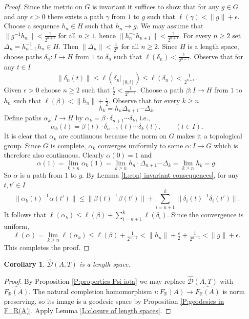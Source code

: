 \documentclass[12pt]{amsart}
\newtheorem{cor}[prop]{Corollary}
\theoremstyle{definition}
\def\RR{\ensuremath{\mathbb{R}}}
\def\Free{F}
\def\D{\mathcal{D}}
\def\tD{\hat{\D}}
\begin{document}
\begin{proof}
Since the metric on $G$ is invariant it suffices to show that for any $g \in G$ and any $\epsilon >0$ there exists a path $\gamma$ from $1$ to $g$ such that $\ell(\gamma)<\|g\|+\epsilon$.
Choose a sequence $h_n \in H$ such that $h_n \to g$.
We may assume that $\|g^{-1}h_n\|<\tfrac{1}{2^{n+2}}$ for all $n \geq 1$, hence $\|h_n^{-1}h_{n+1}\|<\tfrac{1}{2^{n+1}}$.
For every $n \geq 2$ set $\Delta_n=h_{n-1}^{-1} h_n \in H$.
Then $\| \Delta_n\| < \tfrac{1}{2^n}$ for all $n \geq 2$.
Since $H$ is a length space, choose paths $\delta_n \colon I \to H$ from $1$ to $\delta_n$ such that $\ell(\delta_n)<\tfrac{1}{2^{n-1}}$.
Observe that for any $t \in I$
\[
\|\delta_n(t)\| \leq \ell(\delta_n|_{[0,t]}) \leq \ell(\delta_n)<\tfrac{1}{2^{n-1}}.
\]
Given $\epsilon>0$ choose $n \geq 2$ such that $\tfrac{\epsilon}{2} < \tfrac{1}{2^{n-2}}$.
Choose a path $\beta \colon I \to H$ from $1$ to $h_n$ such that $\ell(\beta)<\|h_n\|+\tfrac{\epsilon}{2}$.
Observe that for every $k \geq n$
\[
h_k = h_n \Delta_{n+1} \cdots \Delta_k.
\]
Define paths $\alpha_k \colon I \to H$ by $\alpha_k = \beta \cdot \delta_{n+1} \cdots \delta_k$, i.e., 
\[
\alpha_k(t) = \beta(t) \cdot \delta_{n+1}(t) \cdots \delta_k(t), \qquad (t \in I).
\]
It is clear that $\alpha_k$ are continuous because the norm on $G$ makes it a topological group.
Since $G$ is complete, $\alpha_k$ converges uniformly to some $\alpha \colon I \to G$ which is therefore also continuous.
Clearly $\alpha(0)=1$ and 
\[
\alpha(1)=\lim_{k \geq n} \alpha_k(1) = \lim_{k \geq n} h_n \cdot \Delta_{n+1}\cdots \Delta_k = \lim_{k \geq n} h_k = g.
\]
So $\alpha$ is a path from $1$ to $g$.
By Lemma \ref{L:conj invariant consequences}, for any $t,t' \in I$
\[
\| \alpha_k(t)^{-1}\alpha(t')\| \leq \|\beta(t)^{-1} \beta(t')\| + \sum_{i={n+1}}^k \|\delta_i(t)^{-1} \delta_i(t')\|.
\]
It follows that $\ell(\alpha_k) \leq \ell(\beta)+\sum_{i=n+1}^k \ell(\delta_i)$.
Since the convergence is uniform, 
\[
\ell(\alpha)=\lim_{k \geq n} \ell(\alpha_k) \leq \ell(\beta) + \tfrac{1}{2^{n-1}} < \|h_n\|+\tfrac{\epsilon}{2} + \tfrac{1}{2^{n-1}} < \|g\| + \epsilon.
\]
This completes the proof.
\end{proof}




\begin{cor}\label{C:tD is length space} %
$\tD(A,T)$ is a length space.
\end{cor}

\begin{proof}
By Proposition \ref{P:properties Psi iota} we may replace $\tD(A,T)$ with $\widehat{\Free_\RR(A)}$.
The natural completion homomorphism $i \colon \Free_\RR(A) \to \widehat{\Free_\RR(A)}$ is norm preserving, so its image is a geodesic space by Proposition \ref{P:geodesics in F_R(A)}.
Apply Lemma \ref{L:closure of length spaces}.
\end{proof}
\end{document}
